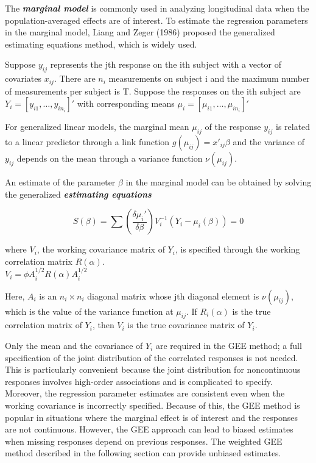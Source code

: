 \documentclass[letterpaper,11pt]{article}
\begin{document}
The \textit{\textbf{marginal model}} is commonly used in analyzing longitudinal data when the population-averaged effects are
of interest. To estimate the regression parameters in the marginal model, Liang and Zeger (1986) proposed the
generalized estimating equations method, which is widely used.

Suppose $y_{ij}$ represents the jth response on the ith subject with a vector of covariates $x_{ij}$.
There are $n_{i}$ measurements on subject i and the maximum number of measurements per subject is
T. 
Suppose the responses on the ith subject are $Y_{i}=[y_{i1}, \ldots, y_{in_{i}}]'$ with corresponding means
$\mu_{i}=[\mu_{i1}, \ldots, \mu_{in_{i}}]'$

For generalized linear models, the marginal mean $\mu_{ij}$ of the response $y_{ij}$ is related to a linear predictor through a link
function $g(\mu_{ij})= x'_{ij} \beta$ and the variance of $y_{ij}$ depends on the mean through a variance function $\nu(\mu_{ij})$.

An estimate of the parameter $\beta$ in the marginal model can be obtained by solving the generalized \textit{\textbf{estimating equations}}


\begin{equation}
S(\beta)= \sum (\frac { \delta \mu_{i}'} {\delta \beta} ) V^{-1}_{i} (Y_{i} - \mu_{i} (\beta))=0
\end{equation}

where $V_{i}$, the working covariance matrix of $Y_{i}$, is specified through the working correlation matrix $R(\alpha)$. \\
$V_{i}= \phi A^{1/2}_{i} R(\alpha) A^{1/2}_{i}$


Here, $A_{i}$ is an $n_{i} \times n_{i}$ diagonal matrix whose jth diagonal element is $\nu(\mu_{ij})$, which is the value of the variance
function at $\mu_{ij}$. If $R_{i}(\alpha)$ is the true correlation matrix of $Y_{i}$, then $V_{i}$ is the true covariance matrix of $Y_{i}$. 

Only the mean and the covariance of $Y_{i}$ are required in the GEE method; a full specification of the joint distribution of
the correlated responses is not needed. This is particularly convenient because the joint distribution for noncontinuous
responses involves high-order associations and is complicated to specify.  Moreover, the regression parameter estimates are consistent even when the working covariance is incorrectly specified. Because of this, the GEE method is popular in situations where the marginal effect is of interest and the responses are not continuous. However, the GEE approach can lead to biased estimates when missing responses depend on previous responses. The weighted GEE method described in the following section can provide unbiased estimates.
\end{document}
